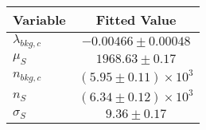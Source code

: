 \begin{tabular}[t]{lc}
\hline
Variable &Fitted Value\\
\hline\hline
$\lambda_{bkg,c}$&$-0.00466\pm0.00048$\\
\hline
$\mu_{S}$&$1968.63\pm0.17$\\
\hline
$n_{bkg,c}$&$(5.95\pm0.11)\times 10^3$\\
\hline
$n_{S}$&$(6.34\pm0.12)\times 10^3$\\
\hline
$\sigma_{S}$&$9.36\pm0.17$\\
\hline
\end{tabular}